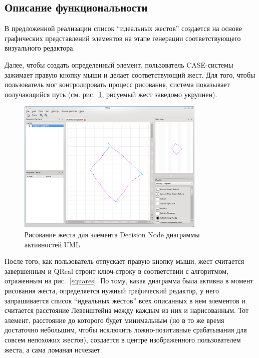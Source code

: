 \documentclass[a5paper]{article}
\begin{document}
\subsection{Описание функциональности}
В предложенной реализации список ``идеальных жестов'' создается на основе графических представлений элементов на этапе генерации соответствующего визуального редактора.

Далее, чтобы создать определенный элемент, пользователь CASE-системы зажимает правую кнопку мыши и делает соответствующий жест. Для того, чтобы пользователь мог контролировать процесс рисования, система показывает получающийся путь (см. рис.~\ref{drawing}, рисуемый жест заведомо укрупнен).

\begin{figure} [ht]
  \begin{center}
    \includegraphics[width=0.8\textwidth, bb=0 0 800 600]{05-drawing.png}
    \caption{Рисование жеста для элемента Decision Node диаграммы активностей UML}
    \label{drawing}
  \end{center}
\end{figure}

После того, как пользователь отпускает правую кнопку мыши, жест считается завершенным и QReal строит ключ-строку в соответствии с алгоритмом, отраженным на рис.~\ref{squares}. По тому, какая диаграмма была активна в момент рисования жеста, определяется нужный графический редактор, у него запрашивается список ``идеальных жестов'' всех описанных в нем элементов и считается расстояние Левенштейна между каждым из них и нарисованным. Тот элемент, расстояние до которого будет минимальным (но в то же время достаточно небольшим, чтобы исключить ложно-позитивные срабатывания для совсем непохожих жестов), создается в центре изображенного пользователем жеста, а сама ломаная исчезает. 
\end{document}
